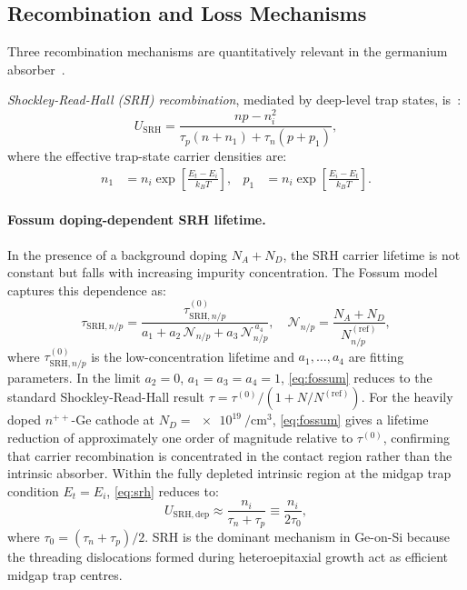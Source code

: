 \subsection[Recombination and Loss Mechanisms]{Recombination and Loss Mechanisms}
\label{subsec:pd_recombination}

Three recombination mechanisms are quantitatively relevant in the germanium
absorber~\cite{SzeNg2006,Basu2003}.

\emph{Shockley-Read-Hall (SRH) recombination}, mediated by deep-level trap
states, is~\cite{Hamadou2023}:
\begin{equation}
    U_{\mathrm{SRH}}
    = \frac{np - n_i^2}{\tau_p\!\left(n + n_1\right)
      + \tau_n\!\left(p + p_1\right)},
    \label{eq:srh}
\end{equation}
where the effective trap-state carrier densities are:
\begin{align}
    n_1 &= n_i\exp\!\left[\frac{E_t-E_i}{k_BT}\right], &
    p_1 &= n_i\exp\!\left[\frac{E_i-E_t}{k_BT}\right].
    \label{eq:np1_trap}
\end{align}

\paragraph{Fossum doping-dependent SRH lifetime.}
In the presence of a background doping $N_A+N_D$, the SRH carrier lifetime is
not constant but falls with increasing impurity concentration. The Fossum
model~\cite{Hamadou2023} captures this dependence as:
\begin{equation}
    \tau_{\mathrm{SRH},n/p}
    = \frac{\tau^{(0)}_{\mathrm{SRH},n/p}}
           {a_1 + a_2\,\mathcal{N}_{n/p}
            + a_3\,\mathcal{N}_{n/p}^{\,a_4}},
    \quad
    \mathcal{N}_{n/p} = \frac{N_A+N_D}{N^{(\mathrm{ref})}_{n/p}},
    \label{eq:fossum}
\end{equation}
where $\tau^{(0)}_{\mathrm{SRH},n/p}$ is the low-concentration lifetime and
$a_1,\ldots,a_4$ are fitting parameters. In the limit $a_2=0$,
$a_1=a_3=a_4=1$, \cref{eq:fossum} reduces to the standard
Shockley-Read-Hall result $\tau=\tau^{(0)}/(1+N/N^{(\mathrm{ref})})$.
For the heavily doped $n^{++}$-Ge cathode at
$N_D=\SI{e19}{\per\centi\metre\cubed}$, \cref{eq:fossum} gives a lifetime
reduction of approximately one order of magnitude relative to $\tau^{(0)}$,
confirming that carrier recombination is concentrated in the contact region
rather than the intrinsic absorber.
Within the fully depleted intrinsic region at the midgap trap condition
$E_t=E_i$, \cref{eq:srh} reduces to:
\begin{equation}
    U_{\mathrm{SRH,dep}} \approx \frac{n_i}{\tau_n + \tau_p}
    \equiv \frac{n_i}{2\tau_0},
    \label{eq:srh_dep}
\end{equation}
where $\tau_0=(\tau_n+\tau_p)/2$. SRH is the dominant mechanism in Ge-on-Si
because the threading dislocations formed during heteroepitaxial growth act as
efficient midgap trap centres.

